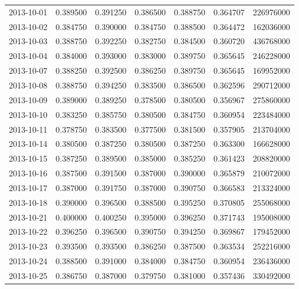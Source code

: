 \begin{tabular}{lrrrrrr}
2013-10-01 &    0.389500 &    0.391250 &    0.386500 &    0.388750 &    0.364707 &   226976000 \\
2013-10-02 &    0.384750 &    0.390000 &    0.384750 &    0.388500 &    0.364472 &   162036000 \\
2013-10-03 &    0.388750 &    0.392250 &    0.382750 &    0.384500 &    0.360720 &   436768000 \\
2013-10-04 &    0.384000 &    0.393000 &    0.383000 &    0.389750 &    0.365645 &   246228000 \\
2013-10-07 &    0.388250 &    0.392500 &    0.386250 &    0.389750 &    0.365645 &   169952000 \\
2013-10-08 &    0.388750 &    0.394250 &    0.383500 &    0.386500 &    0.362596 &   290712000 \\
2013-10-09 &    0.389000 &    0.389250 &    0.378500 &    0.380500 &    0.356967 &   275860000 \\
2013-10-10 &    0.383250 &    0.385750 &    0.380500 &    0.384750 &    0.360954 &   223484000 \\
2013-10-11 &    0.378750 &    0.383500 &    0.377500 &    0.381500 &    0.357905 &   213704000 \\
2013-10-14 &    0.380500 &    0.387250 &    0.380500 &    0.387250 &    0.363300 &   166628000 \\
2013-10-15 &    0.387250 &    0.389500 &    0.385000 &    0.385250 &    0.361423 &   208820000 \\
2013-10-16 &    0.387500 &    0.391500 &    0.387000 &    0.390000 &    0.365879 &   210072000 \\
2013-10-17 &    0.387000 &    0.391750 &    0.387000 &    0.390750 &    0.366583 &   213324000 \\
2013-10-18 &    0.390000 &    0.396500 &    0.388500 &    0.395250 &    0.370805 &   255068000 \\
2013-10-21 &    0.400000 &    0.400250 &    0.395000 &    0.396250 &    0.371743 &   195008000 \\
2013-10-22 &    0.396250 &    0.396500 &    0.390750 &    0.394250 &    0.369867 &   179452000 \\
2013-10-23 &    0.393500 &    0.393500 &    0.386250 &    0.387500 &    0.363534 &   252216000 \\
2013-10-24 &    0.388500 &    0.391000 &    0.384000 &    0.384750 &    0.360954 &   236436000 \\
2013-10-25 &    0.386750 &    0.387000 &    0.379750 &    0.381000 &    0.357436 &   330492000 \\

\end{tabular}
